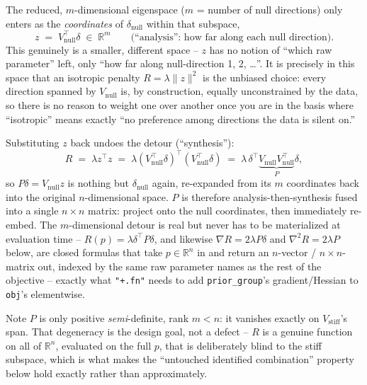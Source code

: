 \documentclass[11pt]{article}
\newcommand{\code}[1]{\texttt{#1}}
\begin{document}
The reduced, $m$-dimensional eigenspace ($m$ = number of null directions)
only enters as the \emph{coordinates} of $\delta_{\mathrm{null}}$ within
that subspace,
\begin{equation}
  z \;=\; V_{\mathrm{null}}^\top\delta \;\in\;\mathbb{R}^m
  \qquad\text{(``analysis'': how far along each null direction).}
\end{equation}
This genuinely is a smaller, different space -- $z$ has no notion of
``which raw parameter'' left, only ``how far along null-direction 1, 2,
\ldots''. It is precisely in this space that an isotropic penalty $R =
\lambda\lVert z\rVert^2$ is the unbiased choice: every direction spanned by
$V_{\mathrm{null}}$ is, by construction, equally unconstrained by the data,
so there is no reason to weight one over another once you are in the basis
where ``isotropic'' means exactly ``no preference among directions the data
is silent on.''

Substituting $z$ back undoes the detour (``synthesis''):
\begin{equation}
  R \;=\; \lambda z^\top z
  \;=\; \lambda(V_{\mathrm{null}}^\top\delta)^\top(V_{\mathrm{null}}^\top\delta)
  \;=\; \lambda\,\delta^\top\underbrace{V_{\mathrm{null}}V_{\mathrm{null}}^\top}_{P}\delta,
\end{equation}
so $P\delta = V_{\mathrm{null}}z$ is nothing but $\delta_{\mathrm{null}}$
again, re-expanded from its $m$ coordinates back into the original
$n$-dimensional space. $P$ is therefore analysis-then-synthesis fused into a
single $n\times n$ matrix: project onto the null coordinates, then
immediately re-embed. The $m$-dimensional detour is real but never has to be
materialized at evaluation time -- $R(p) = \lambda\delta^\top P\delta$, and
likewise $\nabla R = 2\lambda P\delta$ and $\nabla^2 R = 2\lambda P$ below,
are closed formulas that take $p\in\mathbb{R}^n$ in and return an
$n$-vector / $n\times n$-matrix out, indexed by the same raw parameter names
as the rest of the objective -- exactly what \code{"+.fn"} needs to add
\code{prior\_group}'s gradient/Hessian to \code{obj}'s elementwise.

Note $P$ is only positive \emph{semi}-definite, rank $m<n$: it vanishes
exactly on $V_{\mathrm{stiff}}$'s span. That degeneracy is the design goal,
not a defect -- $R$ is a genuine function on all of $\mathbb{R}^n$, evaluated
on the full $p$, that is deliberately blind to the stiff subspace, which is
what makes the ``untouched identified combination'' property below hold
exactly rather than approximately.
\end{document}
